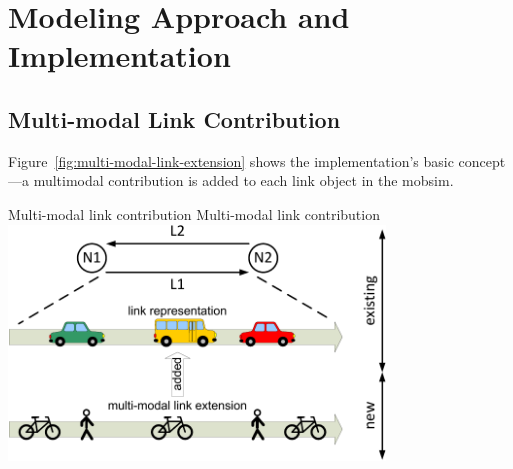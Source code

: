 %
%

\section{Modeling Approach and Implementation}
\subsection{Multi-modal Link Contribution} 
\label{sec:Multi-modalSimulation}
Figure~\ref{fig:multi-modal-link-extension} shows the implementation's basic concept---a \gls{multimodal} contribution is added to each link object in the \gls{mobsim}. 

\createfigure%
{Multi-modal link contribution}%
{Multi-modal link contribution}%
{\label{fig:multi-modal-link-extension}}%
{\includegraphics[width=0.75\textwidth, angle=0]{extending/figures/MultiModalSimulation/multi-modal-link-extension}}%
{}

